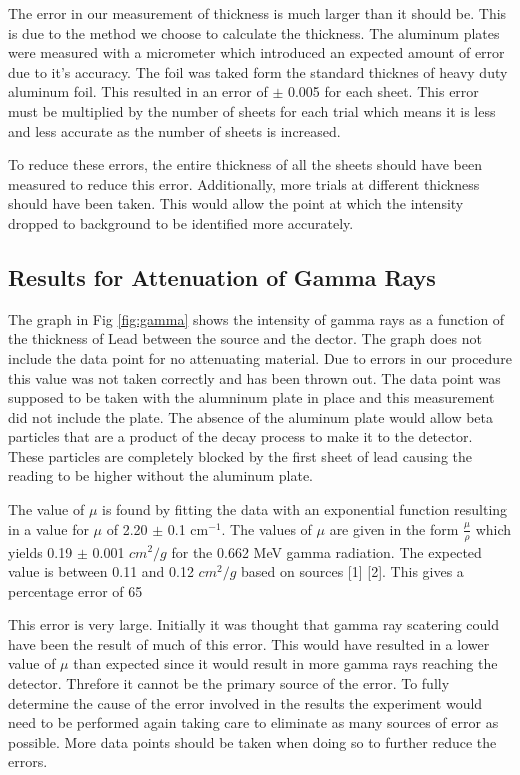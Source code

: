 \documentclass[twocolumn,secnumarabic,amssymb, nobibnotes, aps, pra]{revtex4}
\begin{document}
The error in our measurement of thickness is much larger than it should be.  This is due to the method we choose to calculate the thickness.  The aluminum plates were measured with a micrometer which introduced an expected amount of error due to it's accuracy.  The foil was taked form the standard thicknes of heavy duty aluminum foil.  This resulted in an error of $\pm$ 0.005 for each sheet.  This error must be multiplied by the number of sheets for each trial which means it is less and less accurate as the number of sheets is increased.  

To reduce these errors, the entire thickness of all the sheets should have been measured to reduce this error.  Additionally, more trials at different thickness should have been taken.  This would allow the point at which the intensity dropped to background to be identified more accurately.


\subsection{Results for Attenuation of Gamma Rays}

The graph in Fig \ref{fig:gamma} shows the intensity of gamma rays as a function of the thickness of Lead between the source and the dector.  The graph does not include the data point for no attenuating material.  Due to errors in our procedure this value was not taken correctly and has been thrown out.  The data point was supposed to be taken with the alumninum plate in place and this measurement did not include the plate.  The absence of the aluminum plate would allow beta particles that are a product of the decay process to make it to the detector.  These particles are completely blocked by the first sheet of lead causing the reading to be higher without the aluminum plate.

The value of $\mu$ is found by fitting the data with an exponential function resulting in a value for $\mu$ of 2.20 $\pm$ 0.1 cm$^{-1}$.  The values of $\mu$ are given in the form $\frac{\mu}{\rho}$ which yields  0.19 $\pm$ 0.001 $cm^{2}/g$ for the 0.662 MeV gamma radiation.  The expected value is between 0.11 and 0.12 $cm^{2}/g$ based on sources [1] [2].  This gives a percentage error of 65%

This error is very large.  Initially it was thought that gamma ray scatering could have been the result of much of this error.  This would have resulted in a lower value of $\mu$ than expected since it would result in more gamma rays reaching the detector.  Threfore it cannot be the primary source of the error.  To fully determine the cause of the error involved in the results the experiment would need to be performed again taking care to eliminate as many sources of error as possible.  More data points should be taken when doing so to further reduce the errors.  
\end{document}
